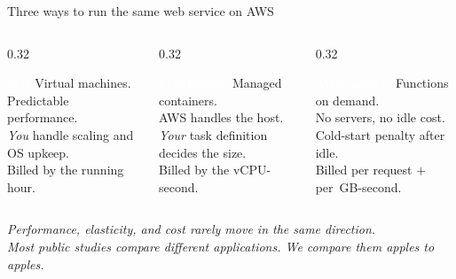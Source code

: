 \documentclass[aspectratio=169,11pt]{beamer}
\begin{document}
\begin{frame}{Three ways to run the same web service on AWS}
  \vspace{4pt}
  \begin{columns}[T,onlytextwidth]
    \begin{column}{0.32\linewidth}
      \begin{block}{\textcolor{white}{EC2}}
        Virtual machines.\\[2pt]
        Predictable performance.\\[2pt]
        \emph{You} handle scaling and OS upkeep.\\[6pt]
        Billed by the running hour.
      \end{block}
    \end{column}
    \begin{column}{0.32\linewidth}
      \begin{block}{\textcolor{white}{ECS Fargate}}
        Managed containers.\\[2pt]
        AWS handles the host.\\[2pt]
        \emph{Your} task definition decides the size.\\[6pt]
        Billed by the vCPU-second.
      \end{block}
    \end{column}
    \begin{column}{0.32\linewidth}
      \begin{block}{\textcolor{white}{AWS Lambda}}
        Functions on demand.\\[2pt]
        No servers, no idle cost.\\[2pt]
        Cold-start penalty after idle.\\[6pt]
        Billed per request \(+\) per~GB-second.
      \end{block}
    \end{column}
  \end{columns}

  \vspace{18pt}
  \begin{center}
    \emph{Performance, elasticity, and cost rarely move in the same direction.}\\[2pt]
    \emph{Most public studies compare different applications. We compare them apples to apples.}
  \end{center}
\end{frame}
\end{document}
